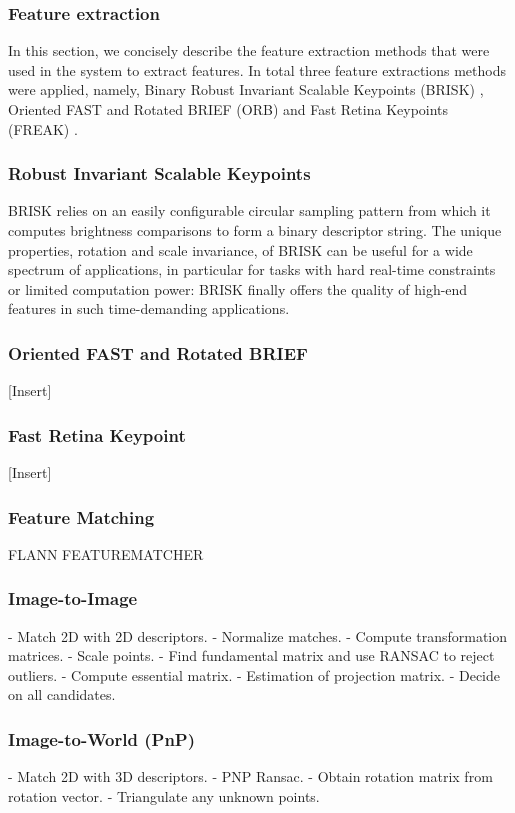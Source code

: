 \documentclass[a4paper]{article}
\begin{document}
\subsubsection{Feature extraction}
In this section, we concisely describe the feature extraction methods that were
used in the system to extract features. In total three feature extractions
methods were applied, namely, Binary Robust Invariant Scalable Keypoints
(BRISK) \citep{Leutenegger2011}, Oriented FAST and Rotated BRIEF (ORB)
\citep{Rublee2011} and Fast Retina Keypoints (FREAK) \citep{Ortiz2012}.

\subsubsection*{Robust Invariant Scalable Keypoints}
BRISK relies on an easily configurable circular sampling pattern from which it
computes brightness comparisons to form a binary descriptor string. The unique
properties, rotation and scale invariance, of BRISK can be useful for a wide
spectrum of applications, in particular for tasks with hard real-time
constraints or limited computation power: BRISK finally offers the quality of
high-end features in such time-demanding applications.

\subsubsection*{Oriented FAST and Rotated BRIEF}
[Insert]
\subsubsection*{Fast Retina Keypoint}
[Insert]

\subsubsection{Feature Matching}
FLANN FEATUREMATCHER \citep{Muja2009}

\subsubsection{Image-to-Image}
- Match 2D with 2D descriptors.
- Normalize matches.
- Compute transformation matrices.
- Scale points.
- Find fundamental matrix and use RANSAC to reject outliers.
- Compute essential matrix.
- Estimation of projection matrix.
- Decide on all candidates.

\subsubsection{Image-to-World (PnP)}
- Match 2D with 3D descriptors.
- PNP Ransac.
- Obtain rotation matrix from rotation vector.
- Triangulate any unknown points.
\end{document}

